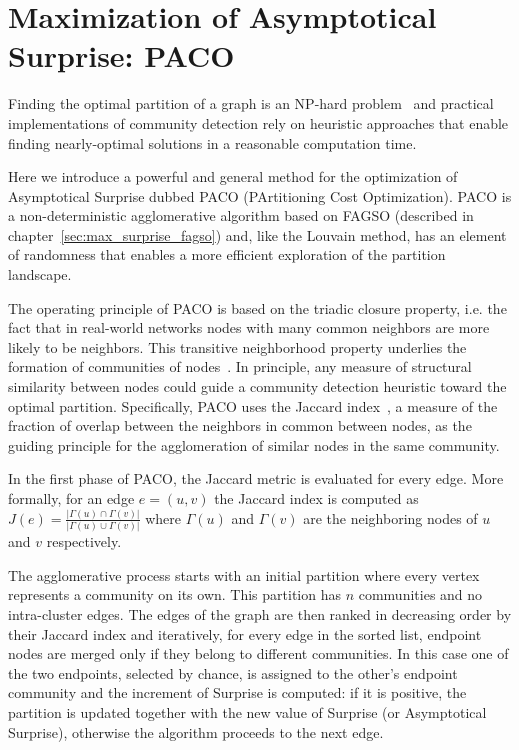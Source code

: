 \section{Maximization of Asymptotical Surprise: PACO}
Finding the optimal partition of a graph is an NP-hard problem~\cite{fortunato2010} and practical implementations of community detection rely on heuristic approaches that enable finding nearly-optimal solutions in a reasonable computation time.

Here we introduce a powerful and general method for the optimization of Asymptotical Surprise dubbed PACO (PArtitioning Cost Optimization). PACO is a non-deterministic agglomerative algorithm based on FAGSO (described in chapter~\ref{sec:max_surprise_fagso}) and, like the Louvain method, has an element of randomness that enables a more efficient exploration of the partition landscape.

The operating principle of PACO is based on the triadic closure property, i.e. the fact that in real-world networks nodes with many common neighbors are more likely to be neighbors. This transitive neighborhood property underlies the formation of communities of nodes~\cite{bianconi2014,eustace2015}. In principle, any measure of structural similarity between nodes could guide a community detection heuristic toward the optimal partition. Specifically, PACO uses the Jaccard index~\cite{jaccard1901}, a measure of the fraction of overlap between the neighbors in common between nodes, as the guiding principle for the agglomeration of similar nodes in the same community.

In the first phase of PACO, the Jaccard metric is evaluated for every edge. More formally, for an edge $e=(u,v)$ the Jaccard index is computed as $J(e)=\frac{|\Gamma(u) \cap \Gamma(v)|}{|\Gamma(u) \cup \Gamma(v)|}$ where $\Gamma(u)$ and $\Gamma(v)$ are the neighboring nodes of $u$ and $v$ respectively.

The agglomerative process starts with an initial partition where every vertex represents a community on its own. This partition has $n$ communities and no intra-cluster edges.
The edges of the graph are then ranked in decreasing order by their Jaccard index and iteratively, for every edge in the sorted list, endpoint nodes are merged only if they belong to different communities. In this case one of the two endpoints, selected by chance, is assigned to the other's endpoint community and the increment of Surprise is computed: if it is positive, the partition is updated together with the new value of Surprise (or Asymptotical Surprise), otherwise the algorithm proceeds to the next edge.  

